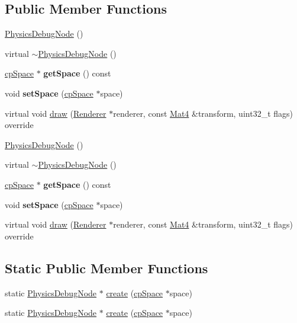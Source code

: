 \subsection*{Public Member Functions}
\begin{DoxyCompactItemize}
\item 
\hyperlink{classPhysicsDebugNode_a561828aaa80df4ec84e120ddf1c86220}{Physics\+Debug\+Node} ()
\item 
virtual \hyperlink{classPhysicsDebugNode_ac89dc49bb3661dc7b4cb5615f0dc53ea}{$\sim$\+Physics\+Debug\+Node} ()
\item 
\mbox{\label{classPhysicsDebugNode_aac3c794455502825c3a5b63a73b26703}} 
\hyperlink{structcpSpace}{cp\+Space} $\ast$ {\bfseries get\+Space} () const
\item 
\mbox{\label{classPhysicsDebugNode_a8b0dfd3d1746b3bdd4e0adce276feb31}} 
void {\bfseries set\+Space} (\hyperlink{structcpSpace}{cp\+Space} $\ast$space)
\item 
virtual void \hyperlink{classPhysicsDebugNode_a78fe785679cead2a155f0f767932a89f}{draw} (\hyperlink{classRenderer}{Renderer} $\ast$renderer, const \hyperlink{classMat4}{Mat4} \&transform, uint32\+\_\+t flags) override
\item 
\hyperlink{classPhysicsDebugNode_a561828aaa80df4ec84e120ddf1c86220}{Physics\+Debug\+Node} ()
\item 
virtual \hyperlink{classPhysicsDebugNode_a9e584cc9a17c04b2aa79c0a61e54508b}{$\sim$\+Physics\+Debug\+Node} ()
\item 
\mbox{\label{classPhysicsDebugNode_ad8e4c159ce9afd52606e0bdcb6a2ae38}} 
\hyperlink{structcpSpace}{cp\+Space} $\ast$ {\bfseries get\+Space} () const
\item 
\mbox{\label{classPhysicsDebugNode_a8b0dfd3d1746b3bdd4e0adce276feb31}} 
void {\bfseries set\+Space} (\hyperlink{structcpSpace}{cp\+Space} $\ast$space)
\item 
virtual void \hyperlink{classPhysicsDebugNode_a71bda24e446762fc1a1ae2d31927d19a}{draw} (\hyperlink{classRenderer}{Renderer} $\ast$renderer, const \hyperlink{classMat4}{Mat4} \&transform, uint32\+\_\+t flags) override
\end{DoxyCompactItemize}
\subsection*{Static Public Member Functions}
\begin{DoxyCompactItemize}
\item 
static \hyperlink{classPhysicsDebugNode}{Physics\+Debug\+Node} $\ast$ \hyperlink{classPhysicsDebugNode_ad9f5a3ffb68c2eedd2514b34086aaab3}{create} (\hyperlink{structcpSpace}{cp\+Space} $\ast$space)
\item 
static \hyperlink{classPhysicsDebugNode}{Physics\+Debug\+Node} $\ast$ \hyperlink{classPhysicsDebugNode_a2d8079d3eb796ab6f26e8c2c2d11e0d7}{create} (\hyperlink{structcpSpace}{cp\+Space} $\ast$space)
\end{DoxyCompactItemize}
